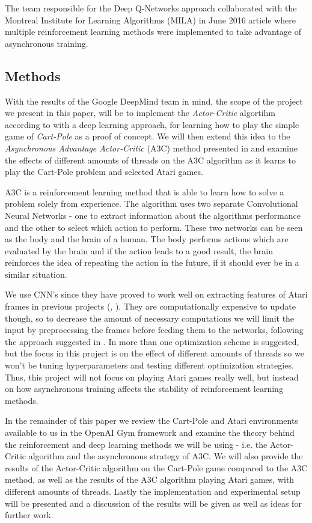 \documentclass[11pt]{article}
\begin{document}
The team responsible for the Deep Q-Networks approach collaborated with
the Montreal Institute for Learning Algorithms (MILA) in June 2016 article
\cite{a3c} where multiple reinforcement learning methods were implemented to
take advantage of asynchronous training.

\subsection{Methods}

With the results of the Google DeepMind team in mind\cite{a3c}, the scope of the project we present in
this paper, will be to implement the \textit{Actor-Critic} algortihm according to \cite{RLbook}
with a deep learning approach, for learning how to play the simple game of \textit{Cart-Pole}\cite{cart_pole}
as a proof of concept.
We will then extend this idea to the \textit{Asynchronous Advantage Actor-Critic} (A3C)
method presented in \cite{a3c} and examine the effects of different amounts of threads
on the A3C algorithm as it learns to play the Cart-Pole problem and selected Atari games.

A3C is a reinforcement learning method that is able to learn
how to solve a problem solely from experience.
The algorithm uses two separate Convolutional Neural Networks
 - one to extract information about the algorithms performance 
and the other to select which action to perform.
These two networks can be seen as the body and the brain of a human.
The body performs actions which are evaluated by the brain and if
the action leads to a good result, the brain reinforces the idea
of repeating the action in the future, if it should ever be in a similar
situation.

We use CNN's since they have proved to work well on extracting features
of Atari frames in previous projects (\cite{dqn}, \cite{a3c}).
They are computationally expensive to update though,
so to decrease the amount of necessary computations we will limit
the input by preprocessing the frames before feeding them
to the networks, following the approach suggested in \cite{dqn-nature}.
In \cite{a3c} more than one optimization scheme
is suggested, but the focus in this project is on the effect of
different amounts of threads so we won't be tuning hyperparameters
and testing different optimization strategies.
Thus, this project will not focus on playing Atari games really well,
but instead on how asynchronous training affects the stability of
reinforcement learning methods.

In the remainder of this paper we review the 
Cart-Pole and Atari environments available to us in
the OpenAI Gym framework and examine the theory behind the
reinforcement and deep learning methods we will be using
- i.e. the Actor-Critic algorithm and the asynchronous strategy of A3C.
We will also provide the results of the Actor-Critic algorithm
on the Cart-Pole game compared to the A3C method, as well as the
results of the A3C algorithm playing Atari games, with different 
amounts of threads. 
Lastly the implementation and experimental setup will be presented and
a discussion of the results will be given as well as ideas for further
work.
\end{document}
